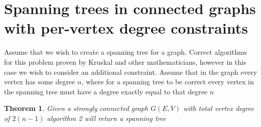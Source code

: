 \documentclass{article}
\newtheorem{theorem}{Theorem}
\begin{document}
\section{Spanning trees in connected graphs with per-vertex degree constraints}
Assume that we wish to create a spanning tree for a graph. Correct algorithms for this problem proven by Kruskal and other
mathematicians, however in this case we wish to consider an additional constraint. Assume that in the graph every vertex has some degree $n$,
where for a spanning tree to be correct every vertex in the spanning tree must have a degree exactly equal to that degree $n$
 
\begin{theorem}
Given a strongly connected graph $G(E,V)$ with total vertex degree of $2(n-1)$ algorithm 2 will return a spanning tree
\end{theorem}
\end{document}
